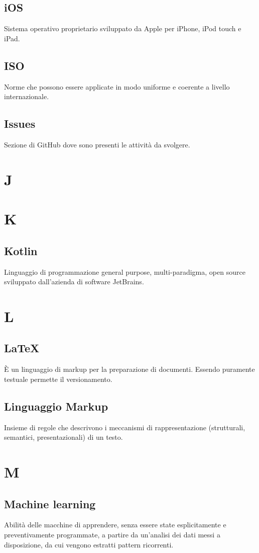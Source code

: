 \subsection*{iOS} Sistema operativo proprietario sviluppato da Apple per iPhone, iPod touch e iPad.
\subsection*{ISO} Norme che possono essere applicate in modo uniforme e coerente a livello internazionale.
\subsection*{Issues} Sezione di GitHub dove sono presenti le attività da svolgere.
\newpage
\section{J}
\newpage
\section{K}
\subsection*{Kotlin} Linguaggio di programmazione general purpose, multi-paradigma, open source sviluppato dall'azienda di software JetBrains.
\newpage
\section{L}
\subsection*{LaTeX}  È un linguaggio di markup per la preparazione di documenti. Essendo puramente testuale  permette il versionamento.
\subsection*{Linguaggio Markup} Insieme di regole che descrivono i meccanismi di rappresentazione (strutturali, semantici, presentazionali) di un testo.
\newpage
\section{M}
\subsection*{Machine learning} Abilità delle macchine di apprendere, senza essere state esplicitamente e preventivamente programmate, a partire da un'analisi dei dati messi a disposizione, da cui vengono estratti pattern ricorrenti.
